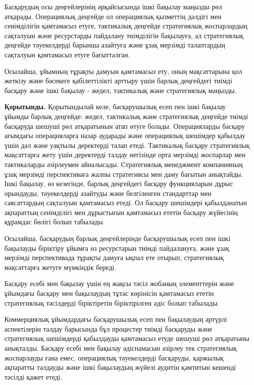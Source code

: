 \begin{multicols}{2}
Басқарудың осы деңгейлерінің әрқайсысында ішкі бақылау маңызды рөл
атқарады. Операциялық деңгейде ол операциялық қызметтің дәлдігі мен
сенімділігін қамтамасыз етуге, тактикалық деңгейде стратегиялық
жоспарлардың сақталуын және ресурстарды пайдалану тиімділігін бақылауға,
ал стратегиялық деңгейде тәуекелдерді барынша азайтуға және ұзақ
мерзімді талаптардың сақталуын қамтамасыз етуге бағытталған.

Осылайша, ұйымның тұрақты дамуын қамтамасыз ету, оның мақсаттарына қол
жеткізу және бәсекеге қабілеттілікті арттыру үшін барлық деңгейдегі
тиімді басқару және ішкі бақылау - жедел, тактикалық және стратегиялық
маңызды.

{\bfseries Қорытынды.} Қорытындылай келе, басқарушылық есеп пен ішкі
бақылау ұйымды барлық деңгейде: жедел, тактикалық және стратегиялық
деңгейде тиімді басқаруда шешуші рөл атқаратынын атап өтуге болады.
Операцияларды басқару ағымдағы операцияларға назар аударады және
операциялық шешімдер қабылдау үшін дәл және уақтылы деректерді талап
етеді. Тактикалық басқару стратегиялық мақсаттарға жету үшін деректерді
талдау негізінде орта мерзімді жоспарлар мен тактикаларды әзірлеумен
айналысады. Стратегиялық менеджмент компанияның ұзақ мерзімді
перспективаға жалпы стратегиясы мен даму бағытын анықтайды. Ішкі
бақылау, өз кезегінде, барлық деңгейдегі басқару функцияларын дұрыс
орындауды, тәуекелдерді азайтуды және белгіленген стандарттар мен
саясаттардың сақталуын қамтамасыз етеді. Ол басқару шешімдері
қабылданатын ақпараттың сенімділігі мен дұрыстығын қамтамасыз ететін
басқару жүйесінің құрамдас бөлігі болып табылады.

Осылайша, басқарудың барлық деңгейлерінде басқарушылық есеп пен ішкі
бақылауды біріктіру ұйымға өз ресурстарын тиімді пайдалануға, және ұзақ
мерзімді перспективада тұрақты дамуға ықпал ете отырып, стратегиялық
мақсаттарға жетуге мүмкіндік береді.

Басқару есебі мен бақылау үшін ең жақсы тәсіл жобаның элементтерін және
ұйымдағы басқару мен бақылаудың тұтас көрінісін қамтамасыз ететін
стратегиялық тәсілдерді біріктіретін біріктірілген әдіс болып табылады.

Коммерциялық ұйымдардағы басқарушылық есеп пен бақылаудың әртүрлі
аспектілерін талдау барысында бұл процестер тиімді басқаруды және
стратегиялық шешімдерді қабылдауды қамтамасыз етуде шешуші рөл
атқаратыны анықталды. Басқару есебі мен бақылау әдіснамасын әзірлеу тек
стратегиялық жоспарлауды ғана емес, операциялық тәуекелдерді басқаруды,
қаржылық ақпаратты талдауды және ішкі бақылаудың жүйелі аудитін қамтитын
кешенді тәсілді қажет етеді.


\end{multicols}
